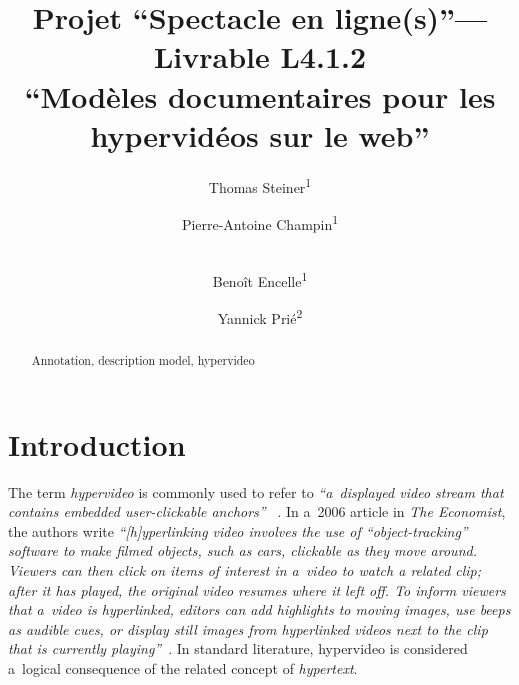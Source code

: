 \documentclass[runningheads,a4paper]{llncs}
\newcommand{\keywords}[1]{\par\addvspace\baselineskip
\noindent\keywordname\enspace\ignorespaces#1}
\begin{document}
\mainmatter  %

\title{Projet ``Spectacle en ligne(s)''---Livrable L4.1.2\\``Modèles documentaires pour les hypervidéos sur le web''}


\author{
  Thomas Steiner\textsuperscript{1} \and
  Pierre-Antoine Champin\textsuperscript{1} \and \\
  Benoît Encelle\textsuperscript{1}\and
  Yannick Prié\textsuperscript{2}
}
%


\maketitle

\begin{abstract}
\keywords{Annotation, description model, hypervideo}
\end{abstract}

\section{Introduction}

The term \emph{hypervideo} is commonly used to refer to
\textit{``a~displayed video stream that contains embedded user-clickable anchors''}%
~\cite{sawhney1996hypercafe,smith2002extensible}.
In a~2006 article in \emph{The Economist}, the authors write 
\textit{``[h]yperlinking video involves the use of ``object-tracking'' software
to make filmed objects, such as cars, clickable as they move around.
Viewers can then click on items of interest in a~video
to watch a related clip; after it has played,
the original video resumes where it left off.
To inform viewers that a~video is hyperlinked,
editors can add highlights to moving images, use beeps as audible cues,
or display still images from hyperlinked videos
next to the clip that is currently playing''}~\cite{economist2006hypervideo}.
In standard literature, hypervideo is considered a~logical consequence
of the related concept of \emph{hypertext}.
\end{document}
